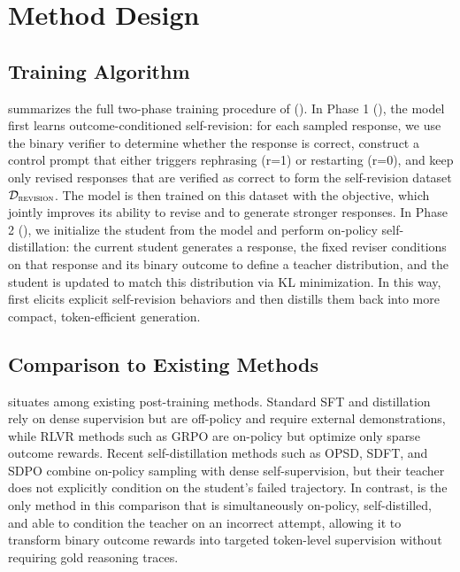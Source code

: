\section{Method Design}
\label{app:methoddesign}


\subsection{\ours{} Training Algorithm}
 summarizes the full two-phase training procedure of \ours{} (). In Phase 1 (\sft{}), the model first learns outcome-conditioned self-revision: for each sampled response, we use the binary verifier to determine whether the response is correct, construct a control prompt that either triggers rephrasing (r=1) or restarting (r=0), and keep only revised responses that are verified as correct to form the self-revision dataset \(\mathcal{D}_{\textsc{revision}}\). The model is then trained on this dataset with the \sft{} objective, which jointly improves its ability to revise and to generate stronger responses. In Phase 2 (\opsd{}), we initialize the student from the \sft{} model and perform on-policy self-distillation: the current student generates a response, the fixed \sft{} reviser conditions on that response and its binary outcome to define a teacher distribution, and the student is updated to match this distribution via KL minimization. In this way, \ours{} first elicits explicit self-revision behaviors and then distills them back into more compact, token-efficient generation.



\clearpage 

\subsection{Comparison to Existing Methods}

 situates \ours{} among existing post-training methods. Standard SFT and distillation rely on dense supervision but are off-policy and require external demonstrations, while RLVR methods such as GRPO are on-policy but optimize only sparse outcome rewards. Recent self-distillation methods such as OPSD, SDFT, and SDPO combine on-policy sampling with dense self-supervision, but their teacher does not explicitly condition on the student’s failed trajectory. In contrast, \ours{} is the only method in this comparison that is simultaneously on-policy, self-distilled, and able to condition the teacher on an incorrect attempt, allowing it to transform binary outcome rewards into targeted token-level supervision without requiring gold reasoning traces.

